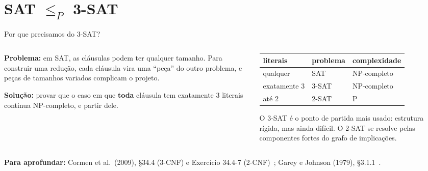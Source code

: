 \documentclass[aspectratio=169,xcolor=table]{beamer}
\newcommand{\fonte}[1]{%
  \vfill
  {\tiny\color{gray!55!black}\textbf{Para aprofundar:} #1\par}%
}
\newcommand{\prob}[1]{\textsc{#1}}
\begin{document}
\section{SAT $\le_P$ 3-SAT}

\begin{frame}{Por que precisamos do \prob{3-SAT}?}
  \begin{columns}[T]
    \begin{column}{0.5\textwidth}
      \small
      \textbf{Problema:} em \prob{SAT}, as cláusulas podem ter qualquer tamanho. Para
      construir uma redução, cada cláusula vira uma ``peça'' do outro problema, e peças de
      tamanhos variados complicam o projeto.
      \medskip

      \textbf{Solução:} provar que o caso em que \textbf{toda} cláusula tem exatamente
      $3$ literais continua NP-completo, e partir dele.
    \end{column}
    \begin{column}{0.46\textwidth}
      \scriptsize
      \centering
      \begin{tabular}{lll}
        \toprule
        literais & problema & complexidade \\
        \midrule
        qualquer & \prob{SAT} & NP-completo \\
        exatamente $3$ & \prob{3-SAT} & NP-completo \\
        até $2$ & \prob{2-SAT} & P \\
        \bottomrule
      \end{tabular}
      \medskip

      \raggedright
      O \prob{3-SAT} é o ponto de partida mais usado: estrutura rígida, mas ainda difícil.
      O \prob{2-SAT} se resolve pelas componentes fortes do grafo de implicações.
    \end{column}
  \end{columns}
  \fonte{Cormen et al.\ (2009), \S 34.4 (3-CNF) e Exercício 34.4-7 (2-CNF)~\cite{cormen2009introduction};
    Garey e Johnson (1979), \S 3.1.1~\cite{garey1979computers}.}
\end{frame}
\end{document}
